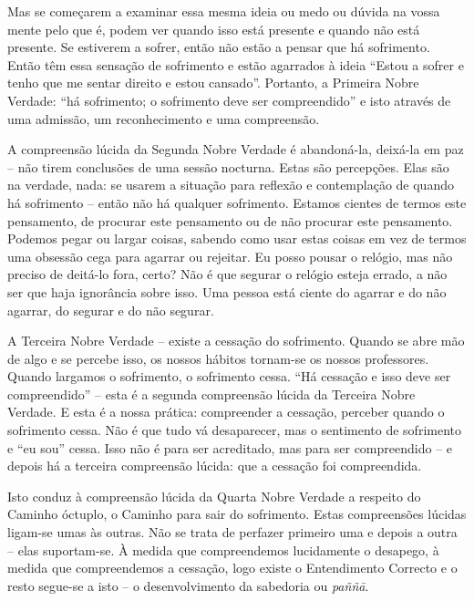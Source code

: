Mas se começarem a examinar essa mesma ideia ou medo ou dúvida na vossa mente
pelo que é, podem ver quando isso está presente e quando não está presente. Se
estiverem a sofrer, então não estão a pensar que há sofrimento. Então têm essa
sensação de sofrimento e estão agarrados à ideia ``Estou a sofrer e tenho que me
sentar direito e estou cansado''. Portanto, a Primeira Nobre Verdade: ``há
sofrimento; o sofrimento deve ser compreendido'' e isto através de uma admissão,
um reconhecimento e uma compreensão.

A compreensão lúcida da Segunda Nobre Verdade é abandoná-la, deixá-la em paz --
não tirem conclusões de uma sessão nocturna. Estas são percepções. Elas são na
verdade, nada: se usarem a situação para reflexão e contemplação de quando há
sofrimento -- então não há qualquer sofrimento. Estamos cientes de termos este
pensamento, de procurar este pensamento ou de não procurar este pensamento.
Podemos pegar ou largar coisas, sabendo como usar estas coisas em vez de termos
uma obsessão cega para agarrar ou rejeitar. Eu posso pousar o relógio, mas não
preciso de deitá-lo fora, certo? Não é que segurar o relógio esteja errado, a
não ser que haja ignorância sobre isso. Uma pessoa está ciente do agarrar e do
não agarrar, do segurar e do não segurar.

A Terceira Nobre Verdade -- existe a cessação do sofrimento. Quando se abre mão
de algo e se percebe isso, os nossos hábitos tornam-se os nossos professores.
Quando largamos o sofrimento, o sofrimento cessa. ``Há cessação e isso deve ser
compreendido'' -- esta é a segunda compreensão lúcida da Terceira Nobre Verdade.
E esta é a nossa prática: compreender a cessação, perceber quando o sofrimento
cessa. Não é que tudo vá desaparecer, mas o sentimento de sofrimento e ``eu
sou'' cessa. Isso não é para ser acreditado, mas para ser compreendido -- e
depois há a terceira compreensão lúcida: que a cessação foi compreendida.

Isto conduz à compreensão lúcida da Quarta Nobre Verdade a respeito do Caminho
óctuplo, o Caminho para sair do sofrimento. Estas compreensões lúcidas ligam-se
umas às outras. Não se trata de perfazer primeiro uma e depois a outra -- elas
suportam-se. À medida que compreendemos lucidamente o desapego, à medida que
compreendemos a cessação, logo existe o Entendimento Correcto e o resto segue-se
a isto -- o desenvolvimento da sabedoria ou \emph{paññā}.


